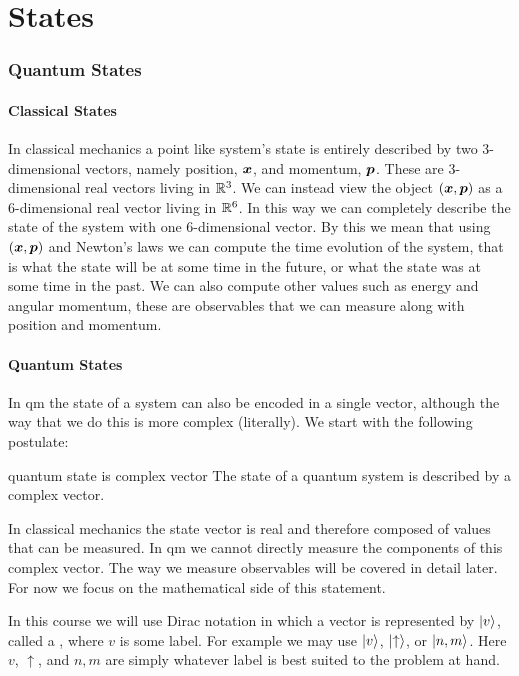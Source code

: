 \part{States}
    \section{Quantum States}
    \subsection{Classical States}
    In classical mechanics a point like system's state is entirely described by two 3-dimensional vectors, namely position, \(\bm{x}\), and momentum, \(\bm{p}\).
    These are 3-dimensional real vectors living in \(\mathbb{R}^3\).
    We can instead view the object \((\bm{x}, \bm{p})\) as a 6-dimensional real vector living in \(\mathbb{R}^6\).
    In this way we can completely describe the state of the system with one 6-dimensional vector.
    By this we mean that using \((\bm{x}, \bm{p})\) and Newton's laws we can compute the time evolution of the system, that is what the state will be at some time in the future, or what the state was at some time in the past.
    We can also compute other values such as energy and angular momentum, these are observables that we can measure along with position and momentum.
    
    \subsection{Quantum States}
    In \acrfull{qm} the state of a system can also be encoded in a single vector, although the way that we do this is more complex (literally).
    We start with the following postulate:
    \begin{postulate}{}{quantum state is complex vector}
        The state of a quantum system is described by a complex vector.
    \end{postulate}
    In classical mechanics the state vector is real and therefore composed of values that can be measured.
    In \acrshort{qm} we cannot directly measure the components of this complex vector.
    The way we measure observables will be covered in detail later.
    For now we focus on the mathematical side of this statement.
    
    In this course we will use Dirac notation in which a vector is represented by \(\vert {v} \rangle\), called a , where \(v\) is some label.
    For example we may use \(\vert {v} \rangle\), \(\vert {\uparrow} \rangle\), or \(\vert {n, m} \rangle\).
    Here \(v\), \(\uparrow\), and \(n, m\) are simply whatever label is best suited to the problem at hand.
    
